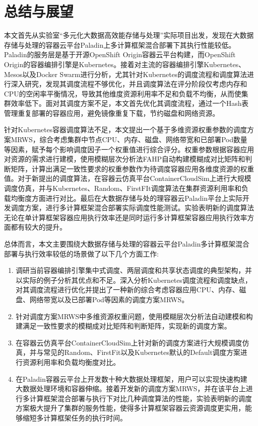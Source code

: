 \chapter{总结与展望}
本文首先从实验室“多元化大数据高效能存储与处理”实际项目出发，发现在大数据存储与处理的容器云平台Paladin上多计算框架混合部署下其执行性能较低。Paladin的服务层是基于开源OpenShift Origin容器云平台构建，而OpenShift Origin的容器编排引擎是Kubernetes。接着对主流的容器编排引擎Kubernetes、Mesos以及Docker Swarm进行分析，尤其针对Kubernetes的调度流程和调度算法进行深入研究，发现其调度流程不够优化，并且调度算法在评分阶段仅考虑内存和CPU的空闲率平衡情况，导致其他维度资源利用率不足和负载不均衡，从而使集群效率低下。面对其调度方案不足，本文首先优化其调度流程，通过一个Hash表管理重复部署的容器应用，避免镜像重复下载，节约磁盘和网络资源。

针对Kubernetes容器调度算法不足，本文提出一个基于多维资源权重参数的调度方案MRWS，综合考虑集群中节点CPU、内存、磁盘、网络带宽和已部署Pod数量等因素，赋予每个影响调度因子一个权重值进行综合评分。权重参数根据容器应用对资源的需求进行建模，使用模糊层次分析法FAHP自动构建模糊成对比矩阵和判断矩阵，计算出满足一致性要求的权重参数作为待调度容器应用各维度资源的权重值。对于新提出的调度算法，在容器云仿真平台ContainerCloudSim上进行大规模调度仿真，并与Kubernetes、Random、FirstFIt调度算法在集群资源利用率和负载均衡度方面进行对比。最后在大数据存储与处的理容器云Paladin平台上实际开发调度方案，进行多计算框架混合部署实际调度性能测试。实验表明新的调度算法无论在单计算框架容器应用执行效率还是同时运行多计算框架容器应用执行效率方面都有较大的提升。

总体而言，本文主要围绕大数据存储与处理的容器云平台Paladin多计算框架混合部署与执行效率较低的场景做了以下几个方面工作:
\begin{enumerate}[(1)]
	\item 调研当前容器编排引擎集中式调度、两层调度和共享状态调度的典型架构，并以实际的例子分析其优点和不足。深入分析Kubernetes调度流程和调度缺点，对其调度流程进行优化并提出了一种新的综合考虑容器应用CPU、内存、磁盘、网络带宽以及已部署Pod等因素的调度方案MRWS。
	\item 针对调度方案MRWS中多维资源权重问题，使用模糊层次分析法自动建模和构建满足一致性要求的模糊成对比矩阵和判断矩阵，实现新的调度方案。
	\item 在容器云仿真平台ContainerCloudSim上针对新的调度方案进行大规模调度仿真，并与常见的Random、FirstFit以及Kubernetes默认的Default调度方案进行资源利用率和负载均衡度对比。
	\item 在Paladin容器云平台上开发数十种大数据处理框架，用户可以实现快速构建大数据处理环境和容器伸缩。接着开发新的调度方案MRWS，并在该平台上进行多计算框架混合部署与执行下对比几种调度算法的性能，实验表明新的调度方案极大提升了集群的服务性能，使得多计算框架容器云资源调度更实用，能够缩短多计算框架任务的执行时间。
\end{enumerate}


